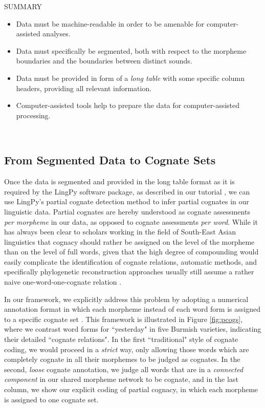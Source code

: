 \documentclass[xetex,svgnames]{scrartcl}
\begin{document}
\begin{center}
  \hline
  SUMMARY \\\hline
  \begin{itemize}
    \item Data must be machine-readable in order to be amenable for computer-assisted analyses.
    \item Data must specifically be segmented, both with respect to the morpheme boundaries and the
      boundaries between distinct sounds.
    \item Data must be provided in form of a \emph{long table} with some specific column headers,
      providing all relevant information.
    \item Computer-assisted tools help to prepare the data for computer-assisted processing.
  \end{itemize}\\\hline
  \endtabular
\end{center}

\subsection{From Segmented Data to Cognate Sets}\label{sec:pcogs}

Once the data is segmented and provided in the long table format as it is required by the LingPy
software package, as described in our tutorial \citep{List2018f}, we can use LingPy's partial
cognate detection method to infer partial cognates in our linguistic data. Partial cognates are
hereby understood as cognate assessments \emph{per morpheme} in our data, as opposed to cognate
assessments \emph{per word}. 
While it has always been clear to scholars working in the field of South-East Asian linguistics that
cognacy should rather be assigned on the level of the morpheme than on the level of full words,
given that the high degree of compounding would easily complicate the identification of cognate
relations, automatic methods, and specifically phylogenetic reconstruction approaches usually still
assume a rather naive one-word-one-cognate relation \citep{List2016f}. 

In our framework, we explicitly address this problem by adopting a numerical annotation format in
which each morpheme instead of each word form is assigned to a specific cognate set
\citep{Hill2017a}. This framework is illustrated in Figure \ref{fig:pcogs}, where we contrast word
forms for ``yesterday" in five Burmish varieties, indicating their detailed ``cognate relations". 
In the first ``traditional" style of cognate coding, we would proceed in a \emph{strict} way, only
allowing those words which are completely cognate in all their morphemes to be judged as cognates.
In the second, \emph{loose} cognate annotation, we judge all words that are in a \emph{connected
component} in our shared morpheme network to be cognate, and in the last column, we show our
explicit coding of partial cognacy, in which each morpheme is assigned to one cognate set.
\end{document}
